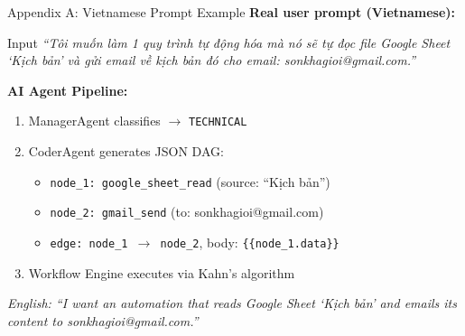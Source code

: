 \documentclass[10pt,aspectratio=169]{beamer}
\begin{document}
\appendix

\begin{frame}{Appendix A: Vietnamese Prompt Example}
    \small
    \textbf{Real user prompt (Vietnamese):}
    \vspace{0.3cm}

    \begin{exampleblock}{Input}
        \textit{``Tôi muốn làm 1 quy trình tự động hóa mà nó sẽ tự đọc file Google Sheet `Kịch bản' và gửi email về kịch bản đó cho email: sonkhagioi@gmail.com.''}
    \end{exampleblock}

    \vspace{0.3cm}
    \textbf{AI Agent Pipeline:}
    \begin{enumerate}
        \item ManagerAgent classifies $\to$ \texttt{TECHNICAL}
        \item CoderAgent generates JSON DAG:
            \begin{itemize}
                \item \texttt{node\_1: google\_sheet\_read} (source: ``Kịch bản'')
                \item \texttt{node\_2: gmail\_send} (to: sonkhagioi@gmail.com)
                \item \texttt{edge: node\_1 $\to$ node\_2}, body: \texttt{\{\{node\_1.data\}\}}
            \end{itemize}
        \item Workflow Engine executes via Kahn's algorithm
    \end{enumerate}

    \vspace{0.2cm}
    \textit{English: ``I want an automation that reads Google Sheet `Kịch bản' and emails its content to sonkhagioi@gmail.com.''}
\end{frame}
\end{document}
